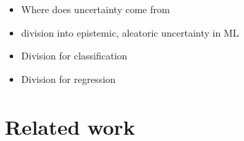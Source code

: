 \begin{itemize}
	\item Where does uncertainty come from
	\item division into epistemic, aleatoric uncertainty in ML
	\item Division for classification
	\item Division for regression 
	
\end{itemize}

\section{Related work}


